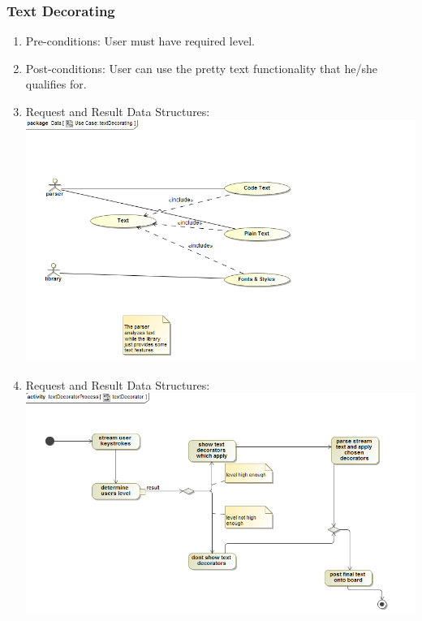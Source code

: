 \documentclass[12pt, oneside]{article}
\begin{document}
\subsubsection{Text Decorating}
\begin{enumerate}
 \item Pre-conditions: User must have required level.
 \\
 
\item Post-conditions: User can use the pretty text functionality that he/she qualifies for. 
\\  
  
 \item Request and Result Data Structures:\\
  \includegraphics[scale=0.4]{textDecorator}\\
 \item Request and Result Data Structures:\\
  \includegraphics[scale=0.4]{textDecoratorProcess}\\


\end{enumerate}
\end{document}
